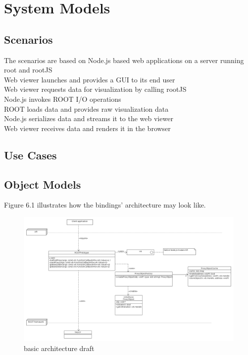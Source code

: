 \chapter{System Models}

\section{Scenarios}
The scenarios are based on Node.js based web applications on a server running root and rootJS\\

Web viewer launches and provides a GUI to its end user	\\
Web viewer requests data for visualization by calling rootJS\\
\indent	Node.js invokes ROOT I/O operations\\
\indent \indent		ROOT loads data and provides raw visualization data\\
\indent	Node.js serializes data and streams it to the web viewer\\
Web viewer receives data and renders it in the browser\\
\section{Use Cases}

\pagebreak[4]

\section{Object Models}
Figure 6.1 illustrates how the bindings' architecture may look like.
\begin{figure}[htb]
	\centering
	\includegraphics[width=18cm]{./latex/resources/architecture.png}
	\caption{basic architecture draft}
\end{figure}

